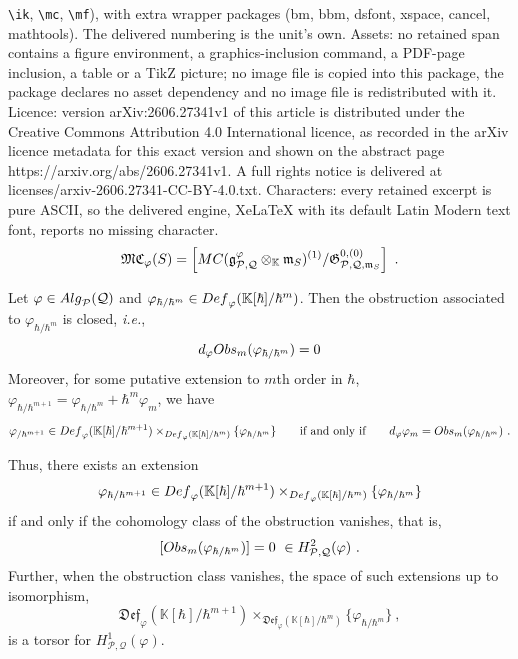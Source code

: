 \documentclass[10pt,a4paper]{amsart}
\newcommand{\ie}{i.e.\ }
\def \ie{{\it i.e.}}
\newcommand{\Alg}{{\textup{Alg}}}
\newcommand{\Def}{{\textup{Def}}}
\newcommand{\K}{{\bb K}}
\newcommand{\MC}{{{\textup{MC}}}}
\newcommand{\Obs}{{\textup{Obs}}}
\newcommand{\bb}{\mathbb}
\newcommand{\fDef}{{\mathfrak{Def}}}
\newcommand{\fMC}{{{\mathfrak{MC}}}}
\newcommand{\g}{{\mf{g}}}
\newcommand{\mc}{\mathcal}
\newcommand{\mf}{\mathfrak}
\begin{document}
\texttt{\textbackslash ik}, \texttt{\textbackslash mc}, \texttt{\textbackslash mf}), with extra wrapper packages (bm, bbm, dsfont, xspace, cancel, mathtools). The delivered numbering is the unit's own. Assets: no retained span contains a figure environment, a graphics-inclusion command, a PDF-page inclusion, a table or a TikZ picture; no image file is copied into this package, the package declares no asset dependency and no image file is redistributed with it. Licence: version arXiv:2606.27341v1 of this article is distributed under the Creative Commons Attribution 4.0 International licence, as recorded in the arXiv licence metadata for this exact version and shown on the abstract page https://arxiv.org/abs/2606.27341v1. A full rights notice is delivered at licenses/arxiv-2606.27341-CC-BY-4.0.txt. Characters: every retained excerpt is pure ASCII, so the delivered engine, XeLaTeX with its default Latin Modern text font, reports no missing character.
\begin{equation}\label{MCstackeqn}
		\fMC_\varphi(S) =\left[ \MC( \g^\varphi_{\mc P, \mc Q}\otimes_{\bb K} \mf m_S)^{(1)}/\mf G_{\mc P,\mc Q,\mf m_S}^{0,(0)}\right]   \ .
	\end{equation}

\begin{prop}\label{DefObsprop} 
Let $\varphi \in \Alg_{\mc P}(\mc Q)$ and $\varphi_{\hbar/\hbar^{m}}\in \Def_\varphi( \K[\hbar]/\hbar^{m})$. Then the obstruction associated to $\varphi_{\hbar/\hbar^m}$ is closed, \ie,
\[
d_\varphi \Obs_m(\varphi_{\hbar/\hbar^m}) =0 
\]
Moreover, for some putative extension to $m$th order in $\hbar$, $\varphi_{\hbar/\hbar^{m+1}} = \varphi_{\hbar/\hbar^m}+ \hbar^m \varphi_m$, we have 
\[ 
\varphi_{ / \hbar^{m+1}} \in \Def_\varphi(\K[\hbar]/\hbar^{m+1}) \times_{\Def_\varphi(\K[\hbar]/\hbar^{m}) } \{\varphi_{\hbar/\hbar^{m}} \} \qquad\text{if and only if} \qquad d_\varphi \varphi_m = \Obs_m(\varphi_{\hbar/\hbar^{m}})  \ .
\]


Thus, there exists an extension
\[ \varphi_{ \hbar/ \hbar^{m+1}} \in \Def_\varphi(\K[\hbar]/\hbar^{m+1}) \times_{\Def_\varphi(\K[\hbar]/\hbar^{m}) } \{\varphi_{\hbar/\hbar^{m}} \} \]
if and only if the cohomology class of the obstruction vanishes, that is,
\[ [ \Obs_m(\varphi_{\hbar/\hbar^{m}})]= 0 \ \in H^2_{\mc P,\mc Q}(\varphi)\ .\]
Further, when the obstruction class vanishes, the space of such extensions up to isomorphism,
\[  \fDef_\varphi(\K[\hbar]/\hbar^{m+1}) \times_{\fDef_\varphi(\K[\hbar]/\hbar^{m}) } \{\varphi_{\hbar/\hbar^{m}} \} \ , \]
is a torsor for $H^1_{\mc P,\mc Q}(\varphi)$.
\end{prop}
\end{document}
